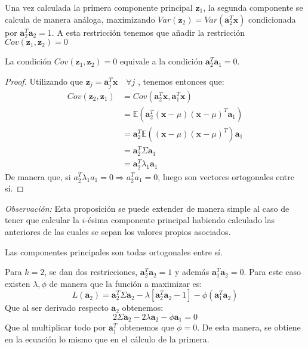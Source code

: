 \noindent Una vez calculada la primera componente principal $\textbf{z}_1$, la segunda componente se calcula de manera análoga, maximizando $Var(\textbf{z}_2)=Var(\textbf{a}_2^T\textbf{x})$ condicionada por $\textbf{a}_2^T\textbf{a}_2=1$. A esta restricción tenemos que añadir la restricción $Cov(\textbf{z}_1,\textbf{z}_2)=0 $

\begin{propo}
La condición $Cov(\textbf{z}_1,\textbf{z}_2)=0 $ equivale a la condición $\textbf{a}_2^T\textbf{a}_1 = 0$.
\begin{proof}
Utilizando que $\textbf{z}_j=\textbf{a}_j^T \textbf{x}\quad \forall j$ , tenemos entonces que:
\begin{align*}
Cov(\textbf{z}_2,\textbf{z}_1)&= Cov (\textbf{a}_2^T\textbf{x},\textbf{a}_1^T\textbf{x})\\ 
&= \mathbb{E}(\textbf{a}_2^T(\textbf{x}-\mu)(\textbf{x}-\mu)^T \textbf{a}_1)\\
&= \textbf{a}_2^T \mathbb{E}((\textbf{x}-\mu)(\textbf{x}-\mu)^T) \textbf{a}_1\\
&= \textbf{a}_2^T \Sigma \textbf{a}_1 \\
&= \textbf{a}_2^T \lambda_1 \textbf{a}_1
\end{align*}
\noindent De manera que, si $a_2^T \lambda_1 a_1 = 0 \Rightarrow a_2^T a_1=0 $, luego son vectores ortogonales entre sí.
\end{proof}
\end{propo}


\noindent \emph{Observación: } Esta proposición se puede extender de manera simple al caso de tener que calcular la $i$-ésima componente principal habiendo calculado las anteriores de las cuales se sepan los valores propios asociados. 

\begin{coro}
Las componentes principales son todas ortogonales entre sí. 
\end{coro}

\noindent Para $k=2$, se dan dos restricciones, $\textbf{a}_2^T\textbf{a}_2=1$ y además $\textbf{a}_1^T \textbf{a}_2=0$. Para este caso existen $\lambda, \phi$ de manera que la función a maximizar es:
\begin{equation}
 L(\textbf{a}_2)=\textbf{a}_2^T \Sigma \textbf{a}_2 - \lambda[\textbf{a}_2^T \textbf{a}_2-1]-\phi(\textbf{a}_1^T \textbf{a}_2)
\end{equation}
Que al ser derivado respecto $\textbf{a}_2$ obtenemos:
\begin{equation}
2\Sigma \textbf{a}_2 - 2\lambda\textbf{a}_2-\phi \textbf{a}_1=0
\end{equation}
Que al multiplicar todo por $\textbf{a}_1^T$ obtenemos que $\phi=0$. De esta manera, se obtiene en la ecuación lo mismo que en el cálculo de la primera. 

